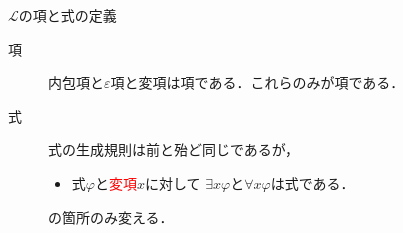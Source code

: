 	
	\begin{itembox}[l]{$\mathcal{L}$の項と式の定義}
		\begin{description}
			\item[項] 内包項と$\varepsilon$項と変項は項である．これらのみが項である．
			\item[式] 式の生成規則は前と殆ど同じであるが，
				\begin{itemize}
					\item 式$\varphi$と\textcolor{red}{変項}$x$に対して
						$\exists x \varphi$と$\forall x \varphi$は式である．
				\end{itemize}
				の箇所のみ変える．
		\end{description}
	\end{itembox}
